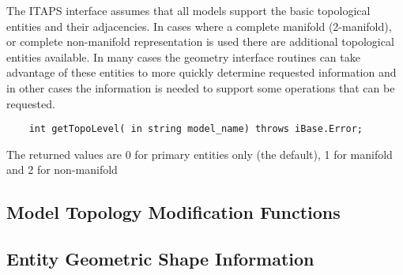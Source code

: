 \documentclass{article}
\begin{document}
The ITAPS interface assumes that all models support the basic 
topological entities and their adjacencies. In cases where a 
complete manifold (2-manifold), or complete non-manifold representation 
is used there are additional topological entities available. 
In many cases the geometry interface routines can take advantage 
of these entities to more quickly determine requested information 
and in other cases the information is needed to support some 
operations that can be requested.

\begin{verbatim}
    int getTopoLevel( in string model_name) throws iBase.Error;
\end{verbatim}
The returned values are 0 for primary entities only (the 
default), 1 for manifold and 2 for non-manifold

\subsection{Model Topology Modification Functions}

\subsection{Entity Geometric Shape Information}
\end{document}
